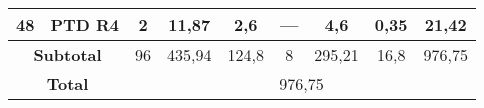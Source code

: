 \begin{table}[h!]
\begin{tabular}{|c|c|c|c|c|c|c|c|c|}
	48                 & PTD R4             & 2                                                    & 11,87                                       & 2,6                                           & ---                                           & 4,6                                              & 0,35                                            & 21,42                                                             \\ \hline
	\multicolumn{2}{|c|}{\textbf{Subtotal}} & 96                                                   & 435,94                                      & 124,8                                         & 8                                             & 295,21                                           & 16,8                                            & 976,75                                                            \\ \hline
	\multicolumn{2}{|c|}{\textbf{Total}}    & \multicolumn{7}{c|}{976,75}                                                                                                                                                                                                                                                                                                                                                 \\ \hline
\end{tabular}
\end{table}